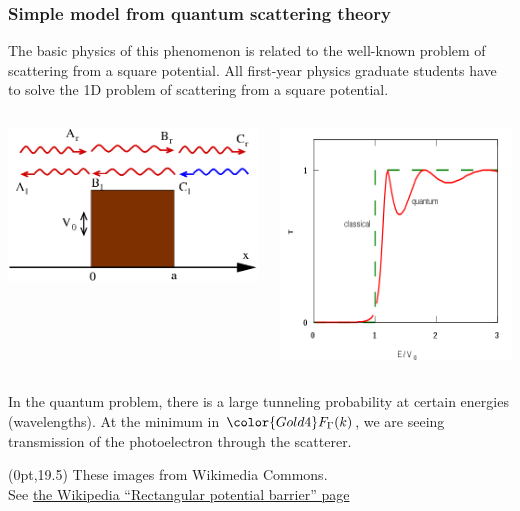 \documentclass[10pt, xcolor=x11names, compress]{beamer}
\begin{document}
\begin{frame}
  \frametitle{Simple model from quantum scattering theory}
  The basic physics of this phenomenon is related to the well-known
  problem of scattering from a square potential.  All first-year
  physics graduate students have to solve the 1D problem of scattering
  from a square potential.
  \begin{columns}[T]
    \begin{column}{0.6\linewidth}
      \centering\includegraphics[width=0.7\linewidth]{Finitepot.png}
    \end{column}
    \begin{column}{0.4\linewidth}
      \includegraphics[width=0.7\linewidth]{Finitebarrdiag.png}      
    \end{column}
  \end{columns}
  In the quantum problem, there is a large tunneling probability at
  certain energies (wavelengths).  At the minimum in
  ${\color{Gold4}F_\Gamma(k)}$, we are seeing transmission of the
  photoelectron through the scatterer.
  \begin{textblock*}{0.7\linewidth}(0pt,19.5\TPVertModule)%
    \tiny%
    These images from Wikimedia Commons.\\See
    \href{http://en.wikipedia.org/wiki/Rectangular_potential_barrier}
    {\color{Blue2}the Wikipedia ``Rectangular potential barrier'' page}
  \end{textblock*}
\end{frame}
\end{document}
